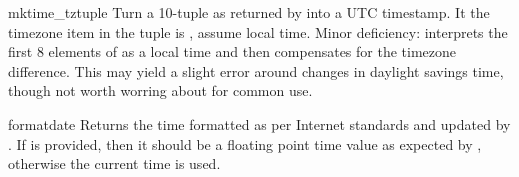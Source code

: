 \begin{funcdesc}{mktime_tz}{tuple}
Turn a 10-tuple as returned by  into a UTC
timestamp.  It the timezone item in the tuple is , assume
local time.  Minor deficiency:  interprets the
first 8 elements of  as a local time and then compensates
for the timezone difference.  This may yield a slight error around
changes in daylight savings time, though not worth worring about for
common use.
\end{funcdesc}

\begin{funcdesc}{formatdate}{}
Returns the time formatted as per Internet standards 
and updated by .  If  is provided, then it
should be a floating point time value as expected by
, otherwise the current time is used.
\end{funcdesc}
